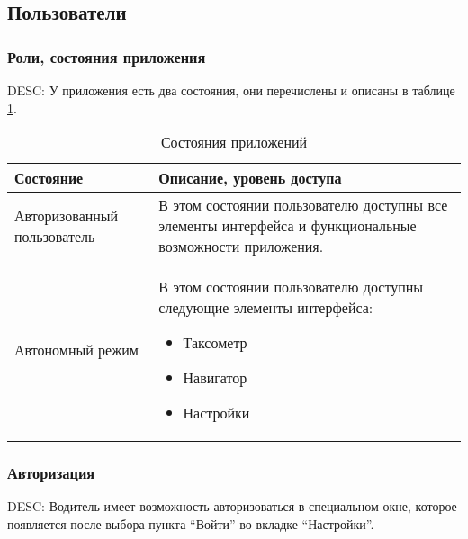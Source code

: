 \subsection{Пользователи}

      \subsubsection{Роли, состояния приложения}

      		DESC: У приложения есть два состояния, они перечислены и описаны в таблице \ref{app_state}. 

             \begin{table}
             \begin{center}
             \caption {Состояния приложений}
             \label{app_state}
             \setlength{\extrarowheight}{2mm}
             \begin{tabular}{|p{5cm}|p{10cm}|}
                 \hline     \textbf{Состояние}&\textbf{Описание, уровень доступа} \\ [2mm]

                 \hline   Авторизованный пользователь & В этом состоянии пользователю доступны все элементы интерфейса и функциональные возможности приложения.\\ [2mm]
                 \hline   Автономный режим & В этом состоянии пользователю доступны следующие элементы интерфейса: \begin{itemize} \item Таксометр \item Навигатор \item Настройки \end{itemize}\\ [2mm]
                  \hline
             \end{tabular}
             \end{center}
             \end{table}
		    
      \subsubsection{Авторизация} \label{options_tab_authorization}

        DESC: Водитель имеет возможность авторизоваться в специальном окне, которое появляется после выбора пункта “Войти” во вкладке “Настройки”.

